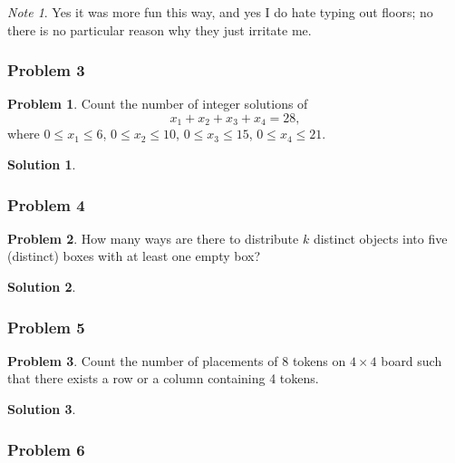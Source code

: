 \documentclass[10pt,a4paper,titlepage,twoside,draft]{article}
\theoremstyle{plain}
\theoremstyle{definition}
\newtheorem*{prob}{Problem}
\newtheorem*{sol}{Solution}
\theoremstyle{remark}
\newtheorem{nt}{Note}
\begin{document}
\begin{nt}
Yes it was more fun this way, and yes I do hate typing out floors; no there is no particular reason why they just irritate me. 
\end{nt}


\subsubsection{Problem 3}

\begin{prob}
Count the number of integer solutions of
\[
 x_1+x_2+x_3+x_4 = 28,
\]
where $0 \leq x_1 \leq 6$, $0 \leq x_2 \leq 10$, $0 \leq x_3 \leq 15$, $0 \leq x_4 \leq 21$.
\end{prob}

\medskip

\begin{sol}

\end{sol}

\subsubsection{Problem 4}

\begin{prob}
How many ways are there to distribute $k$ distinct objects into five (distinct) boxes with at least
one empty box?
\end{prob}

\medskip

\begin{sol}

\end{sol}


\subsubsection{Problem 5}

\begin{prob}
Count the number of placements of 8 tokens on $4 \times 4$ board such that there
exists a row or a column containing 4 tokens.
\end{prob}

\medskip

\begin{sol}

\end{sol}



\subsubsection{Problem 6}
\end{document}
